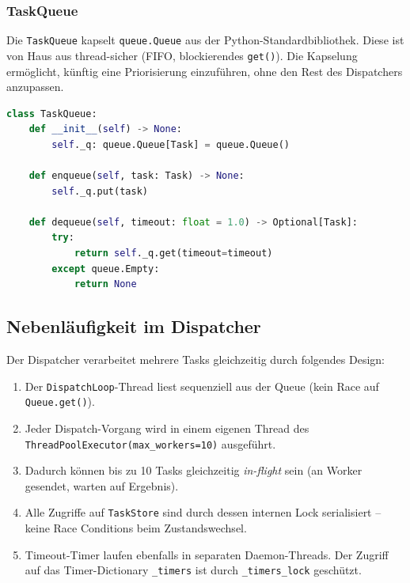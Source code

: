 \subsubsection*{TaskQueue}

Die \texttt{TaskQueue} kapselt \texttt{queue.Queue} aus der Python-Standardbibliothek.
Diese ist von Haus aus thread-sicher (FIFO, blockierendes \texttt{get()}).
Die Kapselung ermöglicht, künftig eine Priorisierung einzuführen,
ohne den Rest des Dispatchers anzupassen.

\begin{lstlisting}[language=Python,caption={TaskQueue-Implementierung (task\_queue.py)}]
class TaskQueue:
    def __init__(self) -> None:
        self._q: queue.Queue[Task] = queue.Queue()

    def enqueue(self, task: Task) -> None:
        self._q.put(task)

    def dequeue(self, timeout: float = 1.0) -> Optional[Task]:
        try:
            return self._q.get(timeout=timeout)
        except queue.Empty:
            return None
\end{lstlisting}

\subsection{Nebenläufigkeit im Dispatcher}

Der Dispatcher verarbeitet mehrere Tasks gleichzeitig durch folgendes Design:

\begin{enumerate}
  \item Der \texttt{DispatchLoop}-Thread liest sequenziell aus der Queue
        (kein Race auf \texttt{Queue.get()}).
  \item Jeder Dispatch-Vorgang wird in einem eigenen Thread des\\
        \texttt{ThreadPoolExecutor(max\_workers=10)} ausgeführt.
  \item Dadurch können bis zu 10 Tasks gleichzeitig \textit{in-flight} sein
        (an Worker gesendet, warten auf Ergebnis).
  \item Alle Zugriffe auf \texttt{TaskStore} sind durch dessen internen Lock
        serialisiert -- keine Race Conditions beim Zustandswechsel.
  \item Timeout-Timer laufen ebenfalls in separaten Daemon-Threads.
        Der Zugriff auf das Timer-Dictionary \texttt{\_timers} ist
        durch \texttt{\_timers\_lock} geschützt.
\end{enumerate}
